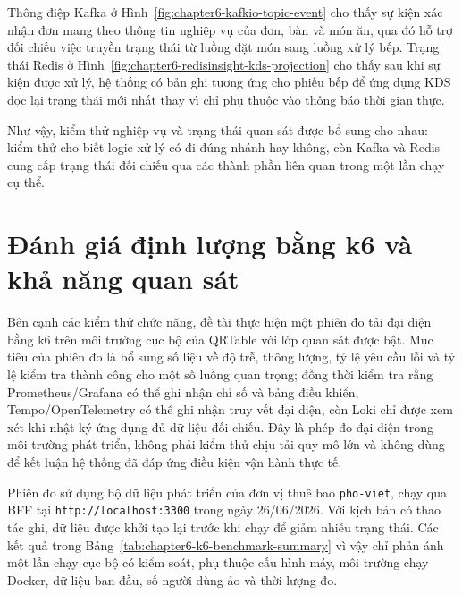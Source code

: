 Thông điệp Kafka ở Hình~\ref{fig:chapter6-kafkio-topic-event} cho thấy sự kiện xác nhận đơn mang theo thông tin nghiệp vụ của đơn, bàn và món ăn, qua đó hỗ trợ đối chiếu việc truyền trạng thái từ luồng đặt món sang luồng xử lý bếp. Trạng thái Redis ở Hình~\ref{fig:chapter6-redisinsight-kds-projection} cho thấy sau khi sự kiện được xử lý, hệ thống có bản ghi tương ứng cho phiếu bếp để ứng dụng KDS đọc lại trạng thái mới nhất thay vì chỉ phụ thuộc vào thông báo thời gian thực.

Như vậy, kiểm thử nghiệp vụ và trạng thái quan sát được bổ sung cho nhau: kiểm thử cho biết logic xử lý có đi đúng nhánh hay không, còn Kafka và Redis cung cấp trạng thái đối chiếu qua các thành phần liên quan trong một lần chạy cụ thể.

\section{Đánh giá định lượng bằng k6 và khả năng quan sát}

Bên cạnh các kiểm thử chức năng, đề tài thực hiện một phiên đo tải đại diện bằng k6 trên môi trường cục bộ của QRTable với lớp quan sát được bật. Mục tiêu của phiên đo là bổ sung số liệu về độ trễ, thông lượng, tỷ lệ yêu cầu lỗi và tỷ lệ kiểm tra thành công cho một số luồng quan trọng; đồng thời kiểm tra rằng Prometheus/Grafana có thể ghi nhận chỉ số và bảng điều khiển, Tempo/OpenTelemetry có thể ghi nhận truy vết đại diện, còn Loki chỉ được xem xét khi nhật ký ứng dụng đủ dữ liệu đối chiếu. Đây là phép đo đại diện trong môi trường phát triển, không phải kiểm thử chịu tải quy mô lớn và không dùng để kết luận hệ thống đã đáp ứng điều kiện vận hành thực tế.

Phiên đo sử dụng bộ dữ liệu phát triển của đơn vị thuê bao \texttt{pho-viet}, chạy qua BFF tại \texttt{http://localhost:3300} trong ngày 26/06/2026. Với kịch bản có thao tác ghi, dữ liệu được khởi tạo lại trước khi chạy để giảm nhiễu trạng thái. Các kết quả trong Bảng~\ref{tab:chapter6-k6-benchmark-summary} vì vậy chỉ phản ánh một lần chạy cục bộ có kiểm soát, phụ thuộc cấu hình máy, môi trường chạy Docker, dữ liệu ban đầu, số người dùng ảo và thời lượng đo.

